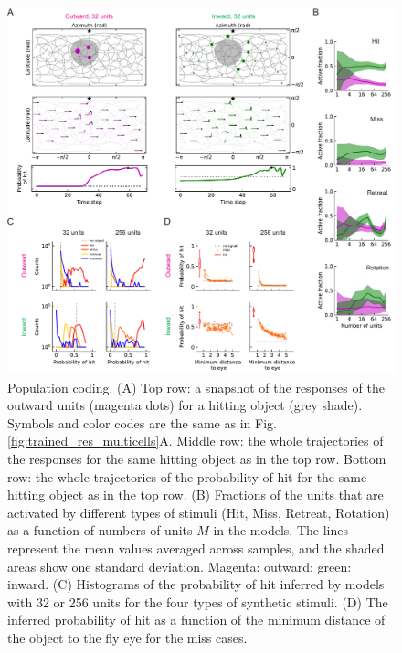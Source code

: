 \documentclass[pdftex,9pt,lineno]{elife}
\begin{document}
\begin{figure}
\begin{fullwidth}
\includegraphics[width=\linewidth]{figures/compare_outward_inward_multiple_units_paper.pdf}
\caption{Population coding. (A) Top row: a snapshot of the responses of the outward units (magenta dots) for a hitting object (grey shade). Symbols and color codes are the same as in Fig. \ref{fig:trained_res_multicells}A. Middle row: the whole trajectories of the responses for the same hitting object as in the top row. Bottom row: the whole trajectories of the probability of hit for the same hitting object as in the top row. (B) Fractions of the units that are activated by different types of stimuli (Hit, Miss, Retreat, Rotation) as a function of numbers of units $M$ in the models. The lines represent the mean values averaged across samples, and the shaded areas show one standard deviation. Magenta: outward; green: inward. (C) Histograms of the probability of hit inferred by models with 32 or 256 units for the four types of synthetic stimuli. (D) The inferred probability of hit as a function of the minimum distance of the object to the fly eye for the miss cases.}
\label{fig:compare_multi}

\end{fullwidth}
\end{figure}
\end{document}
